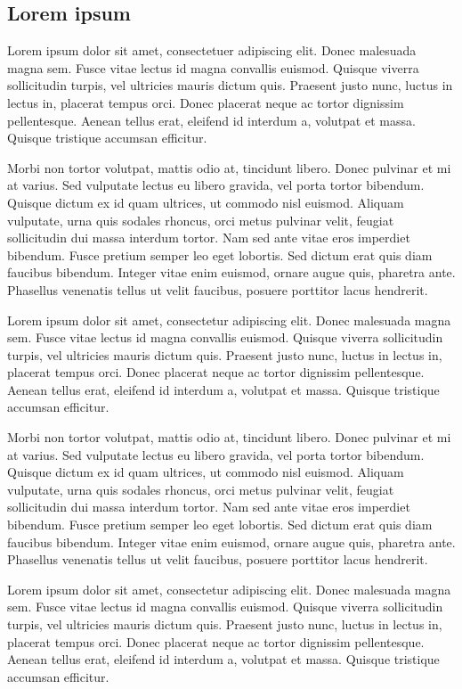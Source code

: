 \documentclass[b5paper,twoside,openright]{scrbook}
\begin{document}
\subsection{Lorem ipsum}
Lorem ipsum dolor sit amet, consectetuer adipiscing elit.
Donec malesuada magna sem.
Fusce vitae lectus id magna convallis euismod.
Quisque viverra sollicitudin turpis, vel ultricies mauris dictum quis.
Praesent justo nunc, luctus in lectus in, placerat tempus orci.
Donec placerat neque ac tortor dignissim pellentesque.
Aenean tellus erat, eleifend id interdum a, volutpat et massa.
Quisque tristique accumsan efficitur.

Morbi non tortor volutpat, mattis odio at, tincidunt libero.
Donec pulvinar et mi at varius.
Sed vulputate lectus eu libero gravida, vel porta tortor bibendum.
Quisque dictum ex id quam ultrices, ut commodo nisl euismod.
Aliquam vulputate, urna quis sodales rhoncus, orci metus pulvinar velit, feugiat sollicitudin dui massa interdum tortor.
Nam sed ante vitae eros imperdiet bibendum.
Fusce pretium semper leo eget lobortis.
Sed dictum erat quis diam faucibus bibendum.
Integer vitae enim euismod, ornare augue quis, pharetra ante.
Phasellus venenatis tellus ut velit faucibus, posuere porttitor lacus hendrerit.

Lorem ipsum dolor sit amet, consectetur adipiscing elit.
Donec malesuada magna sem.
Fusce vitae lectus id magna convallis euismod.
Quisque viverra sollicitudin turpis, vel ultricies mauris dictum quis.
Praesent justo nunc, luctus in lectus in, placerat tempus orci.
Donec placerat neque ac tortor dignissim pellentesque.
Aenean tellus erat, eleifend id interdum a, volutpat et massa.
Quisque tristique accumsan efficitur.

Morbi non tortor volutpat, mattis odio at, tincidunt libero.
Donec pulvinar et mi at varius.
Sed vulputate lectus eu libero gravida, vel porta tortor bibendum.
Quisque dictum ex id quam ultrices, ut commodo nisl euismod.
Aliquam vulputate, urna quis sodales rhoncus, orci metus pulvinar velit, feugiat sollicitudin dui massa interdum tortor.
Nam sed ante vitae eros imperdiet bibendum.
Fusce pretium semper leo eget lobortis.
Sed dictum erat quis diam faucibus bibendum.
Integer vitae enim euismod, ornare augue quis, pharetra ante.
Phasellus venenatis tellus ut velit faucibus, posuere porttitor lacus hendrerit.

Lorem ipsum dolor sit amet, consectetur adipiscing elit.
Donec malesuada magna sem.
Fusce vitae lectus id magna convallis euismod.
Quisque viverra sollicitudin turpis, vel ultricies mauris dictum quis.
Praesent justo nunc, luctus in lectus in, placerat tempus orci.
Donec placerat neque ac tortor dignissim pellentesque.
Aenean tellus erat, eleifend id interdum a, volutpat et massa.
Quisque tristique accumsan efficitur.
\end{document}
